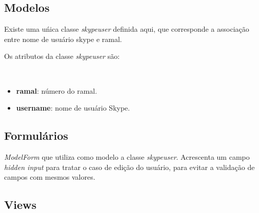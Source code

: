 \documentclass[letterpaper,10pt,brazil]{sphinxmanual}
\begin{document}
\subsection{Modelos}
\label{apps/skypelist:module-skypelist.skypeuser}\label{apps/skypelist:modelos}
Existe uma uńica classe \emph{skypeuser} definida aqui, que corresponde a associação entre nome de usuário skype e ramal.

Os atributos da classe \emph{skypeuser} são:

\begin{fulllineitems}
\label{apps/skypelist:skypelist.skypeuser.skypeuser}~\begin{itemize}
\item {} 
\textbf{ramal}: número do ramal.

\item {} 
\textbf{username}: nome de usuário Skype.

\end{itemize}

\end{fulllineitems}



\subsection{Formulários}
\label{apps/skypelist:module-skypelist.forms}\label{apps/skypelist:formularios}

\begin{fulllineitems}
\label{apps/skypelist:skypelist.forms.skypeform}
\emph{ModelForm} que utiliza como modelo a classe \emph{skypeuser}. Acrescenta um campo \emph{hidden input} para tratar o caso de edição do usuário, para evitar a validação de campos com mesmos valores.

\end{fulllineitems}



\subsection{Views}
\label{apps/skypelist:views}\label{apps/skypelist:module-skypelist.views}
\end{document}
